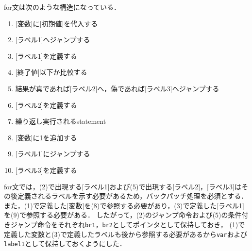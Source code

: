 \documentclass[uplatex]{jsarticle}
\begin{document}
for文は次のような構造になっている．
\begin{enumerate}
  \item {[変数]に[初期値]を代入する}
  \item {[ラベル1]へジャンプする}
  \item {[ラベル1]を定義する}
  \item {[終了値]以下か比較する}
  \item {結果が真であれば[ラベル2]へ，偽であれば[ラベル3]へジャンプする}
  \item {[ラベル2]を定義する}
  \item {繰り返し実行されるstatement}
  \item {[変数]に1を追加する}
  \item {[ラベル1]にジャンプする}
  \item {[ラベル3]を定義する}
\end{enumerate}

for文では，(2)で出現する[ラベル1]および(5)で出現する[ラベル2]，[ラベル3]はその後定義されるラベルを示す必要があるため，バックパッチ処理を必須とする．
また，(1)で定義した[変数]を(8)で参照する必要があり，(3)で定義した[ラベル1]を(9)で参照する必要がある．
したがって，(2)のジャンプ命令および(5)の条件付きジャンプ命令をそれぞれ\verb#br1#，\verb#br2#としてポインタとして保持しておき，
(1)で定義した変数と(3)で定義したラベルも後から参照する必要があるから\verb#var#および\verb#label1#として保持しておくようにした．
\end{document}
